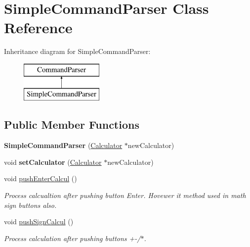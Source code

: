 \hypertarget{class_simple_command_parser}{}\section{Simple\+Command\+Parser Class Reference}
\label{class_simple_command_parser}
Inheritance diagram for Simple\+Command\+Parser\+:\begin{figure}[H]
\begin{center}
\leavevmode
\includegraphics[height=2.000000cm]{class_simple_command_parser}
\end{center}
\end{figure}
\subsection*{Public Member Functions}
\begin{DoxyCompactItemize}
\item 
\hypertarget{class_simple_command_parser_a62668b9abee69fbbe2abf7e46858691a}{}{\bfseries Simple\+Command\+Parser} (\hyperlink{class_calculator}{Calculator} $\ast$new\+Calculator)\label{class_simple_command_parser_a62668b9abee69fbbe2abf7e46858691a}

\item 
\hypertarget{class_simple_command_parser_a759779af9ad397dcd267b2ac43a43509}{}void {\bfseries set\+Calculator} (\hyperlink{class_calculator}{Calculator} $\ast$new\+Calculator)\label{class_simple_command_parser_a759779af9ad397dcd267b2ac43a43509}

\item 
\hypertarget{class_simple_command_parser_a029433f8b08defadd23ea777b1d7018a}{}void \hyperlink{class_simple_command_parser_a029433f8b08defadd23ea777b1d7018a}{push\+Enter\+Calcul} ()\label{class_simple_command_parser_a029433f8b08defadd23ea777b1d7018a}

\begin{DoxyCompactList}\small\item\em Process calcualtion after pushing button Enter. Hovewer it method used in math sign buttons also. \end{DoxyCompactList}\item 
\hypertarget{class_simple_command_parser_a3cd15cf8330f7da84256e0d5af5055bc}{}void \hyperlink{class_simple_command_parser_a3cd15cf8330f7da84256e0d5af5055bc}{push\+Sign\+Calcul} ()\label{class_simple_command_parser_a3cd15cf8330f7da84256e0d5af5055bc}

\begin{DoxyCompactList}\small\item\em Process calculation after pushing buttons +-\//$\ast$. \end{DoxyCompactList}\end{DoxyCompactItemize}
